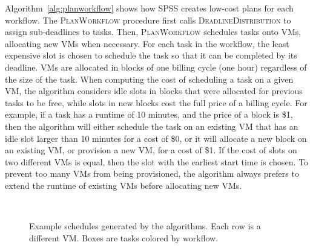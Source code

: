 \documentclass[conference]{IEEEtran}
\begin{document}
Algorithm~\ref{alg:planworkflow} shows how SPSS creates low-cost plans for each
workflow. The \textsc{PlanWorkflow} procedure first calls
\textsc{DeadlineDistribution} to assign sub-deadlines to tasks.
Then, \textsc{PlanWorkflow} schedules
tasks onto VMs, allocating new VMs when necessary. For each task in the
workflow, the least expensive slot is chosen to schedule the task so that it can
be completed by  its deadline. VMs are allocated in blocks of one billing cycle
(one hour) regardless of the size of the task. When computing the cost of
scheduling a task on a given VM, the algorithm considers idle slots in blocks
that were allocated for previous tasks to be free, while slots in new blocks
cost the full price of a billing cycle. 
For example, if a task has a runtime of
10 minutes, and the price of a block is \$1, then the algorithm will either
schedule the task on an existing VM that has an idle slot larger than 10
minutes for a cost of \$0, or it will allocate a new block on an existing VM,
or provision a new VM, for a cost of \$1. 
If the cost of slots on two different
VMs is equal, then the slot with the earliest start time is chosen. To prevent too
many VMs from being provisioned, the algorithm always prefers to extend the
runtime of existing VMs before allocating new VMs. 

\begin{figure}[tb] 
  \centering
  \\
  \caption[Example schedules generated by the algorithms]{Example
  schedules generated by the algorithms. Each row is a different
  VM. Boxes are tasks colored by workflow.}

\end{figure}
\end{document}
